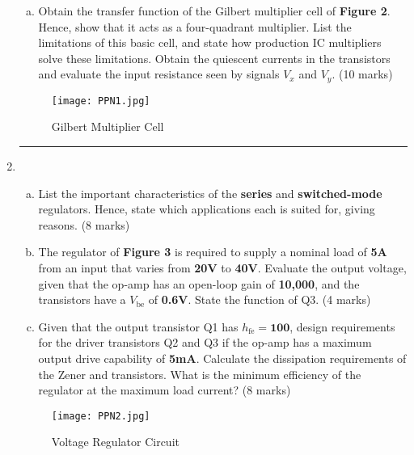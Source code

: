 \documentclass[a4paper,9pt,twoside,openany,twocolumn]{memoir}
\begin{document}
\begin{enumerate}
\begin{enumerate}[(a)]
        \item Obtain the transfer function of the Gilbert multiplier cell of \textbf{Figure 2}. Hence, show that it acts as a four-quadrant multiplier. List the limitations of this basic cell, and state how production IC multipliers solve these limitations. Obtain the quiescent currents in the transistors and evaluate the input resistance seen by signals \( V_x \) and \( V_y \). \hfill{(10 marks)}
    \end{enumerate}

\begin{figure}[h!]
    \centering
    \texttt{[image: PPN1.jpg]}
    \caption{Gilbert Multiplier Cell}
\end{figure}

\begin{center}\rule{0.5\linewidth}{0.5pt}\end{center}

\item
    \begin{enumerate}[(a)]
        \item List the important characteristics of the \textbf{series} and \textbf{switched-mode} regulators. Hence, state which applications each is suited for, giving reasons. \hfill{(8 marks)}

        \item The regulator of \textbf{Figure 3} is required to supply a nominal load of \textbf{5A} from an input that varies from \textbf{20V} to \textbf{40V}. Evaluate the output voltage, given that the op-amp has an open-loop gain of \textbf{10,000}, and the transistors have a \( V_{\text{be}} \) of \textbf{0.6V}. State the function of Q3. \hfill{(4 marks)}
        
        \item Given that the output transistor Q1 has \( h_{\text{fe}} = \textbf{100} \), design requirements for the driver transistors Q2 and Q3 if the op-amp has a maximum output drive capability of \textbf{5mA}. Calculate the dissipation requirements of the Zener and transistors. What is the minimum efficiency of the regulator at the maximum load current? \hfill{(8 marks)}
    \end{enumerate}

\begin{figure}[h!]
    \centering
    \texttt{[image: PPN2.jpg]}
    \caption{Voltage Regulator Circuit}
\end{figure}


\end{enumerate}
\end{document}
